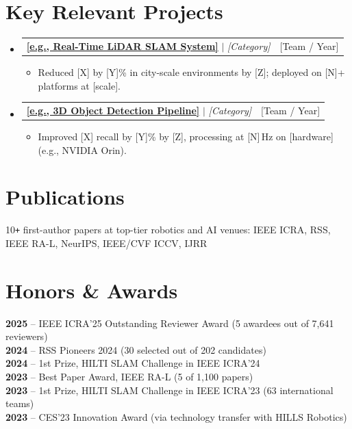 \documentclass[letterpaper,10pt]{article}
\makeatletter
\newcommand{\resumeItem}[1]{
  \item\small{
    {#1 \vspace{-6pt}}
  }
}
\newcommand{\resumeProjectHeading}[2]{
    \item
    \begin{tabular*}{0.97\textwidth}{l@{\extracolsep{\fill}}r}
      \small#1 & #2 \\
    \end{tabular*}\vspace{-4pt}
}
\newcommand{\resumeSubHeadingListStart}{\begin{itemize}[leftmargin=0.15in, label={}]}
\newcommand{\resumeSubHeadingListEnd}{\end{itemize}}
\newcommand{\resumeItemListStart}{\begin{itemize}}
\newcommand{\resumeItemListEnd}{\end{itemize}\vspace{-0pt}}
\makeatother
\begin{document}
\section{Key Relevant Projects}
    \resumeSubHeadingListStart
      \resumeProjectHeading
          {\href{https://github.com/your-org/project1}{\textbf{[e.g., Real-Time LiDAR SLAM System]}} $|$ \emph{[Category]}}{[Team / Year]}
          \resumeItemListStart
            \resumeItem{Reduced [X] by [Y]\% in city-scale environments by [Z]; deployed on [N]+ platforms at [scale].}
          \resumeItemListEnd
      \resumeProjectHeading
          {\href{https://github.com/your-org/project2}{\textbf{[e.g., 3D Object Detection Pipeline]}} $|$ \emph{[Category]}}{[Team / Year]}
          \resumeItemListStart
            \resumeItem{Improved [X] recall by [Y]\% by [Z], processing at [N]\,Hz on [hardware] (e.g., NVIDIA Orin).}
          \resumeItemListEnd
    \resumeSubHeadingListEnd


\section{Publications}
 \begin{itemize}[leftmargin=0.15in, label={}]
    \small{\item{
     10\texttt{+} first-author papers at top-tier robotics and AI venues: IEEE ICRA, RSS, IEEE RA-L, NeurIPS, IEEE/CVF ICCV, IJRR
    }}
 \end{itemize}


\section{Honors \& Awards}
 \begin{itemize}[leftmargin=0.15in, label={}]
    \small{\item{
     \textbf{2025} -- IEEE ICRA'25 Outstanding Reviewer Award (5 awardees out of 7,641 reviewers) \\
     \textbf{2024} -- RSS Pioneers 2024 (30 selected out of 202 candidates) \\
     \textbf{2024} -- 1st Prize, HILTI SLAM Challenge in IEEE ICRA'24 \\
     \textbf{2023} -- Best Paper Award, IEEE RA-L (5 of 1,100 papers) \\
     \textbf{2023} -- 1st Prize, HILTI SLAM Challenge in IEEE ICRA'23 (63 international teams) \\
     \textbf{2023} -- CES'23 Innovation Award (via technology transfer with HILLS Robotics)
    }}
 \end{itemize}
\end{document}
